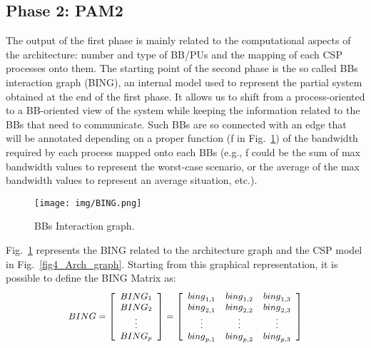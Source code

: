 \subsection{Phase 2: PAM2}\label{refsection2}
%
The output of the first phase is mainly related to the computational aspects of the architecture: number and type of BB/PUs and the mapping of each CSP processes onto them. The starting point of the second phase is the so called BBs interaction graph (BING), an internal model used to represent the partial system obtained at the end of the first phase. It allows us to shift from a process-oriented to a BB-oriented view of the system while keeping the information related to the BBs that need to communicate. Such BBs are so connected with an edge that will be annotated depending on a proper function (f in Fig.~\ref{fig4_BING}) of the bandwidth required by each process mapped onto each BBs (e.g., f could be the sum of max bandwidth values to represent the worst-case scenario, or the average of the max bandwidth values to represent an average situation, etc.). \par
%
\begin{figure}[htbp]
	\centerline{\texttt{[image: img/BING.png]}}
	\caption{BBs Interaction graph.}
	\label{fig4_BING}
\end{figure}
%
Fig.~\ref{fig4_BING} represents the BING related to the architecture graph and the CSP model in Fig.~\ref{fig4_Arch_graph}. Starting from this graphical representation, it is possible to define the BING Matrix as:
%
\begin{equation} \label{eq8_BING}
\small
\begin{aligned}
{BING} = \left[  
\begin{array}{cccc}
{BING}_{1}  \\ 
{BING}_{2}  \\ 
\vdots   \\ 
{BING}_{p}
\end{array}
\right] = \left[  
\begin{array}{cccc}
{bing}_{1,1} & {bing}_{1,2} & {bing}_{1,3}  \\ 
{bing}_{2,1} & {bing}_{2,2} & {bing}_{2,3}  \\ 
\vdots      & \vdots  & \vdots    \\ 
{bing}_{p,1} & {bing}_{p,2} & {bing}_{p,3}  
\end{array}
\right]   \\ 
\end{aligned}
\end{equation}
